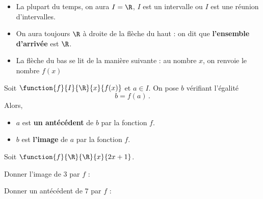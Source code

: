 \documentclass{article}
\begin{document}
\begin{remark}
\hfill
\begin{itemize}
\item La plupart du temps, on aura $I = \R$, $I$ est un intervalle ou $I$ est une réunion d'intervalles.
\item On aura toujours $\R$ à droite de la flèche du haut : on dit que \textbf{l'ensemble d'arrivée} est $\R$.
\item La flèche du bas se lit de la manière suivante : au nombre $x$, on renvoie le nombre $f(x)$
\end{itemize}
\end{remark}
\begin{tcolorbox}
\begin{definition}
Soit $\function{f}{I}{\R}{x}{f(x)}$ et $a \in I$. On pose $b$ vérifiant l'égalité
\begin{equation*}
b = f(a)\,.
\end{equation*}
Alors, 
\begin{itemize}
\item $a$ est \textbf{un antécédent} de $b$ par la fonction $f$.
\item $b$ est \textbf{l'image} de $a$ par la fonction $f$.
\end{itemize}
\end{definition}
\end{tcolorbox}
\begin{example}
Soit $\function{f}{\R}{\R}{x}{2x+1}$.
\begin{enumquestions}
\item Donner l'image de $3$ par $f$ : \answersline
\item Donner un antécédent de $7$ par $f$ : \answersline
\end{enumquestions}
\end{example}
\newpage
\end{document}
